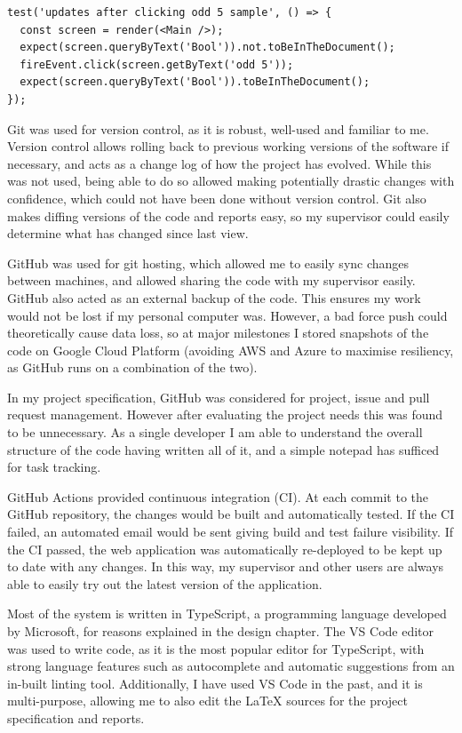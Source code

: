 \documentclass[a4paper,fleqn,oneside,12pt]{report}
\begin{document}
\begin{verbatim}
test('updates after clicking odd 5 sample', () => {
  const screen = render(<Main />);
  expect(screen.queryByText('Bool')).not.toBeInTheDocument();
  fireEvent.click(screen.getByText('odd 5'));
  expect(screen.queryByText('Bool')).toBeInTheDocument();
});
\end{verbatim}
Git was used for version control, as it is robust, well-used and familiar to me. Version control allows rolling back to previous working versions of the software if necessary, and acts as a change log of how the project has evolved. While this was not used, being able to do so allowed making potentially drastic changes with confidence, which could not have been done without version control. Git also makes diffing versions of the code and reports easy, so my supervisor could easily determine what has changed since last view.

GitHub was used for git hosting, which allowed me to easily sync changes between machines, and allowed sharing the code with my supervisor easily. GitHub also acted as an external backup of the code. This ensures my work would not be lost if my personal computer was. However, a bad force push could theoretically cause data loss, so at major milestones I stored snapshots of the code on Google Cloud Platform (avoiding AWS and Azure to maximise resiliency, as GitHub runs on a combination of the two).

In my project specification, GitHub was considered for project, issue and pull request management. However after evaluating the project needs this was found to be unnecessary. As a single developer I am able to understand the overall structure of the code having written all of it, and a simple notepad has sufficed for task tracking.

GitHub Actions provided continuous integration (CI). At each commit to the GitHub repository, the changes would be built and automatically tested. If the CI failed, an automated email would be sent giving build and test failure visibility. If the CI passed, the web application was automatically re-deployed to be kept up to date with any changes. In this way, my supervisor and other users are always able to easily try out the latest version of the application.

Most of the system is written in TypeScript, a programming language developed by Microsoft, for reasons explained in the design chapter. The VS Code editor was used to write code, as it is the most popular editor for TypeScript, with strong language features such as autocomplete and automatic suggestions from an in-built linting tool. Additionally, I have used VS Code in the past, and it is multi-purpose, allowing me to also edit the LaTeX sources for the project specification and reports.
\end{document}
